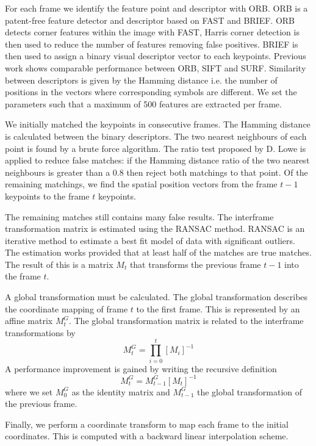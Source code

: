 For each frame we identify the feature point and descriptor with ORB.
ORB is a patent-free feature detector and descriptor based on FAST and BRIEF\cite{Rublee2011}.
ORB detects corner features within the image with FAST,
Harris corner detection is then used to reduce the number of features removing false positives.
BRIEF is then used to assign a binary visual descriptor vector to each keypoints.
Previous work shows comparable performance between ORB, SIFT and SURF\cite{Karami2017}.
Similarity between descriptors is given by the Hamming distance 
i.e. the number of positions in the vectors where corresponding symbols are different.
We set the parameters such that a maximum of 500 features are extracted per frame.

We initially matched the keypoints in consecutive frames.
The Hamming distance is calculated between the binary descriptors.
The two nearest neighbours of each point is found by a brute force algorithm.
The ratio test proposed by D. Lowe\cite{Lowe2004} is applied to reduce false matches:
if the Hamming distance ratio of the two nearest neighbours is greater than a 0.8 then reject both matchings to that point.
Of the remaining matchings, we find the spatial position vectors from the frame $t-1$ keypoints to the frame $t$ keypoints.

The remaining matches still contains many false results.
The interframe transformation matrix is estimated using the RANSAC method\cite{Fischler1981}.
RANSAC is an iterative method to estimate a best fit model of data with significant outliers.
The estimation works provided that at least half of the matches are true matches.
The result of this is a matrix $M_t$ that transforms the previous frame $t-1$ into the frame $t$.

A global transformation must be calculated.
The global transformation describes the coordinate mapping of frame $t$ to the first frame.
This is represented by an affine matrix $M^G_t$.
The global transformation matrix is related to the interframe transformations by
\begin{equation}
	M^G_t =  \prod^{t}_{i=0}[ M_i ]^{-1}
\end{equation}
A performance improvement is gained by writing the recursive definition
\begin{equation}
  M^G_t = M^G_{t-1}[M_t]^{-1}
\end{equation}
where we set $M^G_0$ as the identity matrix and $M^G_{t-1}$ the global transformation of the previous frame.

Finally, we perform a coordinate transform to map each frame to the initial coordinates.
This is computed with a backward linear interpolation scheme. 



